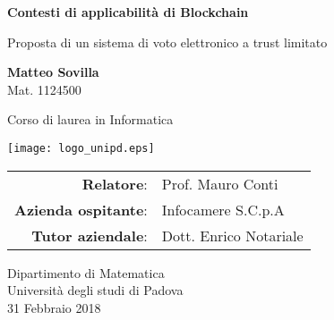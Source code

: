 \begin{titlepage}
    \begin{center}
        \vspace*{1cm}
        
        \Huge
        \textbf{Contesti di applicabilità di Blockchain}
        
        \vspace{0.5cm}
        \large
        Proposta di un sistema di voto elettronico a trust limitato
        
        \vspace{1.5cm}
        
        \textbf{Matteo Sovilla} \\ Mat. 1124500
        
        \vspace{1cm}
        
        Corso di laurea in Informatica
        
        \vspace{0.8cm}
        
        \texttt{[image: logo\_unipd.eps]}

        \vspace{0.5cm}
        
        \vspace{0.5cm}
        
        \begin{center}
        	\begin{tabular}{ r l }
        		\textbf{Relatore}: & Prof. Mauro Conti \\
        		\textbf{Azienda ospitante}: & Infocamere S.C.p.A \\
        		\textbf{Tutor aziendale}: & Dott. Enrico Notariale \\
        	\end{tabular}
        \end{center}
        
        \vspace{0.5cm}
        
        \large
        Dipartimento di Matematica\\
        Università degli studi di Padova\\
        31 Febbraio 2018
        
    \end{center}
\end{titlepage}